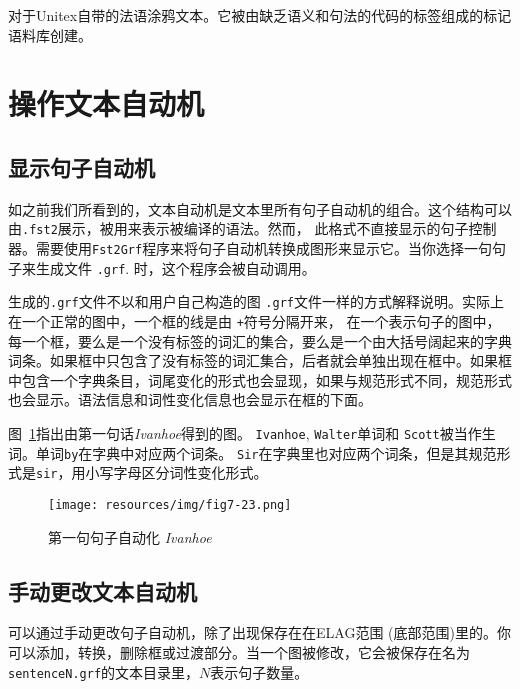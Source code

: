 \bigskip
\noindent
对于Unitex自带的法语涂鸦文本。它被由缺乏语义和句法的代码的标签组成的标记语料库创建。

\section{操作文本自动机}

\subsection{显示句子自动机}
\label{section-displaying-sentence-automata}
如之前我们所看到的，文本自动机是文本里所有句子自动机的组合。这个结构可以由\verb+.fst2+展示，被用来表示被编译的语法。然而， 此格式不直接显示的句子控制器。需要使用\verb+Fst2Grf+程序来将句子自动机转换成图形来显示它。当你选择一句句子来生成文件 \verb+.grf+.
时，这个程序会被自动调用。

\bigskip
\noindent
 生成的\verb+.grf+文件不以和用户自己构造的图 \verb+.grf+文件一样的方式解释说明。实际上在一个正常的图中，一个框的线是由 \verb$+$符号分隔开来，
在一个表示句子的图中，每一个框，要么是一个没有标签的词汇的集合，要么是一个由大括号阔起来的字典词条。如果框中只包含了没有标签的词汇集合，后者就会单独出现在框中。如果框中包含一个字典条目，词尾变化的形式也会显现，如果与规范形式不同，规范形式也会显示。语法信息和词性变化信息也会显示在框的下面。




\bigskip
\noindent
图~\ref{fig-first-sentence-Ivanhoe}指出由第一句话\textit{Ivanhoe}得到的图。 \verb+Ivanhoe+,
\verb+Walter+单词和 \verb+Scott+被当作生词。单词\verb+by+在字典中对应两个词条。 \verb+Sir+在字典里也对应两个词条，但是其规范形式是\verb+sir+，用小写字母区分词性变化形式。



\begin{figure}[!ht]
\begin{center}
\texttt{[image: resources/img/fig7-23.png]}
\caption{第一句句子自动化 \textit{Ivanhoe}\label{fig-first-sentence-Ivanhoe}}
\end{center}
\end{figure}

\subsection{手动更改文本自动机}
可以通过手动更改句子自动机，除了出现保存在在ELAG范围 (底部范围)里的。你可以添加，转换，删除框或过渡部分。当一个图被修改，它会被保存在名为\verb+sentenceN.grf+的文本目录里，$N$表示句子数量。

